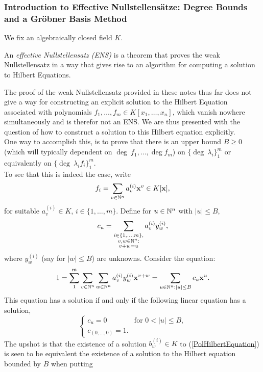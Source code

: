 \subsubsection{Introduction to Effective Nullstellensätze: Degree Bounds and a Gröbner Basis Method}
We fix an algebraically closed field $K$.
\begin{remark}
    An \textit{effective Nullstellensatz (ENS)} is a theorem that proves the weak Nullstellensatz in a way that gives rise to an algorithm for computing a solution to Hilbert Equations.  
\end{remark}
The proof of the weak Nullstellensatz provided in these notes thus far does not give a way for constructing an explicit solution to the Hilbert Equation associated with polynomials $f_1,\dots,f_m\in K[x_1,\dots,x_n]$, which vanish nowhere simultaneously and is therefor not an ENS.
We are thus presented with the question of how to construct a solution to this Hilbert equation explicitly.\\
One way to accomplish this, is to prove that there is an upper bound $B\geq 0$ (which will typically dependent on $\deg \ f_1,\dots,\deg f_m$) on $\{\deg\ \lambda_i\}_1^m$ or equivalently on $\{\deg\ \lambda_if_i\}_1^m$.\\ 
To see that this is indeed the case, write 
$$f_i = \sum_{v\in \mathbb{N}^n} a_v^{(i)} \mathbf{x}^v \in K[\mathbf{x}],$$
for suitable $a_v^{(i)}\in K$, $i\in\{1,\dots,m\}$. Define for $u\in \mathbb{N}^n$ with $\vert u\vert \leq B$,  
$$c_u  =\sum_{\substack{i\in\{1,\dots,m\},\\ v,w\in \mathbb{N}^n :\\ v+w=u}} a_v^{(i)}y_w^{(i)},$$
where $y_w^{(i)}$ (say for $\vert w\vert \leq B$) are unknowns. 
Consider the equation: 
\begin{equation}\label{PolHilbertEquation}
    1 = \sum_1^m \sum_{v\in \mathbb{N}^n} \sum_{w\in \mathbb{N}^n} a_v^{(i)}y_w^{(i)} \mathbf{x}^{v+w} = \sum_{u\in \mathbb{N}^n : \vert u\vert \leq B} c_u \mathbf{x}^u.
\end{equation}
This equation has a solution if and only if the following linear equation has a solution,
\begin{equation}\label{LinHilbertEquation}
\begin{cases}
    c_u = 0 & \text{for } 0<\vert u\vert \leq B,\\
    c_{(0,\dots,0)} = 1.
\end{cases}
\end{equation}
The upshot is that the existence of a  solution  $b_w^{(i)}\in K$ to (\ref{PolHilbertEquation}) is seen to be equivalent the existence of a solution to the Hilbert equation bounded by $B$ when putting 
